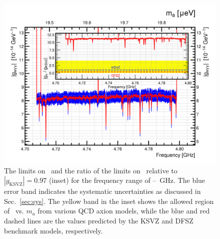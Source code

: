 \begin{figure} [htbp]
  \centering
  \includegraphics[width=12.9cm]{figures/TASEHonly_limits.png}
  \caption{The limits on \gagg\ and the ratio of the limits on 
\ggamma\ relative to $\left|g_\text{KSVZ}\right|=0.97$ 
  (inset) for the frequency range of 
\flo--\fhi~GHz. The blue error band indicates the systematic 
  uncertainties as discussed in Sec.~\ref{sec:sys}. The yellow 
 band in the inset shows the allowed region of \ggamma\ vs. $m_a$ 
 from various QCD axion models, while the blue and red dashed lines are the 
values predicted by the KSVZ and DFSZ benchmark models, respectively.}
  \label{fig:glimit}
\end{figure}


